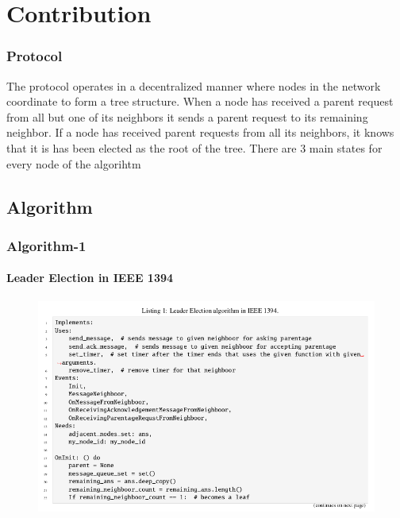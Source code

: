 \documentclass[11pt]{beamer}              %
\begin{document}
\section{Contribution}
\begin{frame}
	\frametitle{Protocol}
    The protocol operates in a decentralized manner where nodes in the network coordinate to form a tree structure. When a node has received a parent request from all but one of its neighbors it sends a parent request to its remaining neighbor. If a node has received parent requests from all its neighbors, it
    knows that it is has been elected as the root of the tree. There are 3 main states for every node of the algorihtm
\end{frame}


\subsection{Algorithm}

\begin{frame}
\frametitle{Algorithm-1}
\framesubtitle{Leader Election in IEEE 1394}
\begin{figure}
    \centering
    \includegraphics[scale=0.4]{figures/IEEE-1.png}
\end{figure}
\end{frame}
\end{document}
